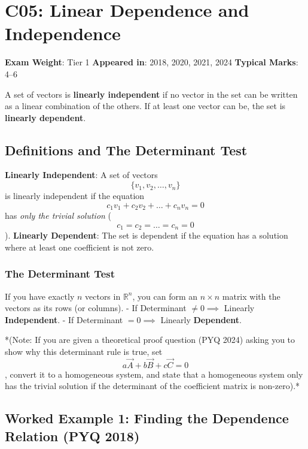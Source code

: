 \documentclass[
]{article}
\renewenvironment{quote}
  {\begin{tcolorbox}[
     colback=calloutbg,
     colframe=calloutframe,
     colupper=callouttext,
     arc=3pt,
     boxrule=0.5pt,
     leftrule=0.5pt,
     borderline west={3pt}{0pt}{calloutaccent},
     left=8pt,
     right=8pt,
     top=6pt,
     bottom=6pt
   ]}
  {\end{tcolorbox}}
\begin{document}
\section{C05: Linear Dependence and
Independence}\label{c05-linear-dependence-and-independence}

\begin{quote}
\textbf{Exam Weight}: Tier 1 \textbar{} \textbf{Appeared in}: 2018,
2020, 2021, 2024 \textbar{} \textbf{Typical Marks}: 4--6
\end{quote}

A set of vectors is \textbf{linearly independent} if no vector in the
set can be written as a linear combination of the others. If at least
one vector can be, the set is \textbf{linearly dependent}.

\subsection{Definitions and The Determinant
Test}\label{definitions-and-the-determinant-test}

\textbf{Linearly Independent}: A set of vectors
\[
\lbrace v_1, v_2, \dots, v_n\rbrace
\]
is linearly independent if the equation
\[
c_1 v_1 + c_2 v_2 + \dots + c_n v_n = 0
\]
has \emph{only the trivial solution} (
\[
c_1 = c_2 = \dots = c_n = 0
\]
). \textbf{Linearly Dependent}: The set is dependent if the equation has
a solution where at least one coefficient is not zero.

\subsubsection{The Determinant Test}\label{the-determinant-test}

If you have exactly \(n\) vectors in \(\mathbb{R}^n\), you can form an
\(n \times n\) matrix with the vectors as its rows (or columns). - If
Determinant \(\neq 0 \implies\) Linearly \textbf{Independent}. - If
Determinant \(= 0 \implies\) Linearly \textbf{Dependent}.

*(Note: If you are given a theoretical proof question (PYQ 2024) asking
you to show why this determinant rule is true, set
\[
a\vec{A} + b\vec{B} + c\vec{C} = 0
\]
, convert it to a homogeneous system, and state that a homogeneous
system only has the trivial solution if the determinant of the
coefficient matrix is non-zero).*

\subsection{Worked Example 1: Finding the Dependence Relation (PYQ
2018)}\label{worked-example-1-finding-the-dependence-relation-pyq-2018}
\end{document}
